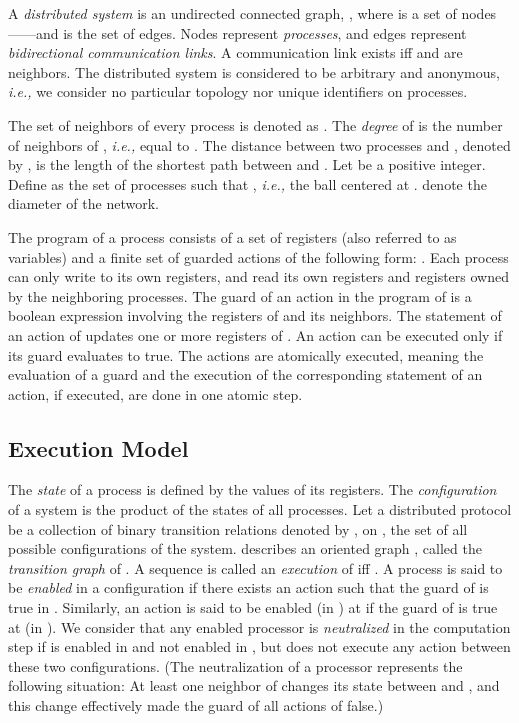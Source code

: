 \documentclass[11pt]{article}
\newcommand{\ie}{\emph{i.e., }}
\begin{document}
A \emph{distributed system} is an undirected connected graph, ,
where  is a set of nodes------and  is the set of edges. Nodes
represent \emph{processes}, and edges represent \emph{bidirectional
communication links}. A communication link  exists iff  and
 are neighbors.
The distributed system is considered to be arbitrary and anonymous, \ie we consider no particular topology 
nor unique identifiers on processes.

The set of neighbors of every process  is denoted as .
The \emph{degree} of  is the number of neighbors of , \ie equal to .
The distance between two processes  and , denoted by ,
is the length of the shortest path between  and .  Let  be a positive integer. Define  
as the set of processes such that , \ie the ball centered at . 
 denote the diameter of the network.

The program of a process consists of a set of registers (also referred to as variables) 
and a finite set of guarded actions of the following form: 
.
Each process can only write to 
its own registers, and read its own registers and registers owned by the neighboring processes.
The guard of an action in the program of  is a boolean
expression involving the registers of  and its neighbors. The
statement of an action of  updates one or more registers of . 
An action can be executed only if its guard evaluates to true.   
The actions are atomically executed, meaning the evaluation of a guard and the execution of
the corresponding statement of an action, if executed, are done in one atomic step.

\subsection{Execution Model}

The \emph{state} of a process is defined by the values of its registers.
The \emph{configuration} of a system is the product of the states of all processes. 
Let a distributed protocol  be a collection of binary transition
relations denoted by , on , the set of all
possible configurations of the system.   describes an
oriented graph , called the \emph{transition graph} of .
A sequence  is called an
\emph{execution} of  iff . 
A process  is said to be \emph{enabled} in a configuration
 if there exists an action  such that 
the guard of  is true in .  
Similarly, an action  is said to be enabled (in ) at 
if the guard of  is true at  (in ).
We consider that any enabled processor  is \emph{neutralized} 
in the computation step  if  is enabled in 
 and not enabled in , but does not execute any action
between these two configurations.  (The neutralization of a processor represents the
following situation: At least one neighbor of  changes its state between 
 and , and this change effectively made the guard of 
all actions of  false.)
\end{document}
